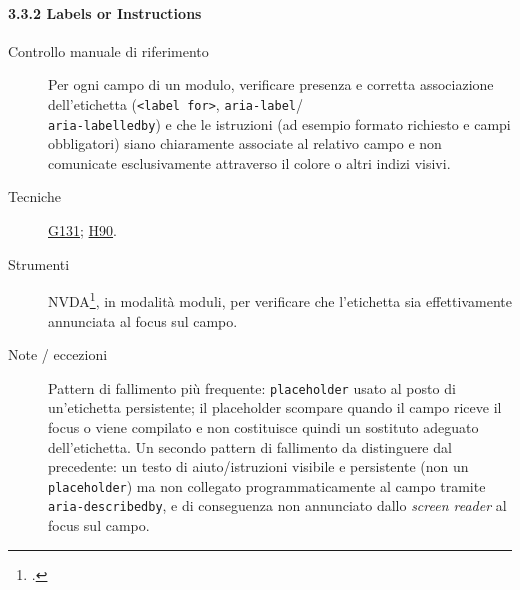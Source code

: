 \paragraph*{3.3.2 Labels or Instructions}
\begin{description}
\item[Controllo manuale di riferimento] Per ogni campo di un modulo, verificare presenza e corretta associazione dell'etichetta (\texttt{<label for>}, \texttt{aria-label}/\\ \texttt{aria-labelledby}) e che le istruzioni (ad esempio formato richiesto e campi obbligatori) siano chiaramente associate al relativo campo e non comunicate esclusivamente attraverso il colore o altri indizi visivi.
\item[Tecniche] \href{https://www.w3.org/WAI/WCAG21/Techniques/general/G131.html}{G131}; \href{https://www.w3.org/WAI/WCAG21/Techniques/html/H90.html}{H90}.
\item[Strumenti] NVDA\footcite{nvda:screenreader}, in modalità moduli, per verificare che l'etichetta sia effettivamente annunciata al focus sul campo.
\item[Note / eccezioni] Pattern di fallimento più frequente: \texttt{placeholder} usato al posto di un'etichetta persistente; il placeholder scompare quando il campo riceve il focus o viene compilato e non costituisce quindi un sostituto adeguato dell'etichetta. Un secondo pattern di fallimento da distinguere dal precedente: un testo di aiuto/istruzioni visibile e persistente (non un \texttt{placeholder}) ma non collegato programmaticamente al campo tramite \texttt{aria-describedby}, e di conseguenza non annunciato dallo \emph{screen reader} al focus sul campo.
\end{description}

